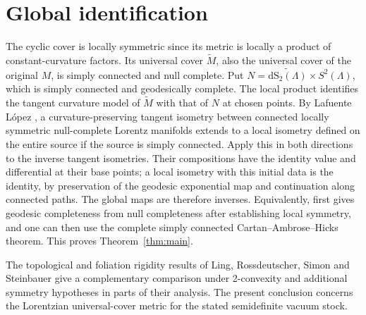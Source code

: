 \documentclass[11pt]{article}
\newcommand{\dS}{\mathrm{dS}}
\begin{document}
\section{Global identification}

The cyclic cover is locally symmetric since its metric is locally
a product of constant-curvature factors. Its universal cover
$\widetilde M$, also the universal cover of the original $M$,
is simply connected and null complete. Put
$N=\widetilde{\dS_2(\Lambda)}\times S^2(\Lambda)$, which is
simply connected and geodesically complete. The local product
identifies the tangent curvature model of $\widetilde M$ with that
of $N$ at chosen points. By Lafuente L\'opez
\cite[Theorem~1]{Laf}, a curvature-preserving tangent isometry
between connected locally symmetric null-complete Lorentz
manifolds extends to a local isometry defined on the entire
source if the source is simply connected. Apply this in both
directions to the inverse tangent isometries. Their compositions
have the identity value and differential at their base points;
a local isometry with this initial data is the identity, by
preservation of the geodesic exponential map and continuation
along connected paths. The global maps are therefore inverses.
Equivalently, \cite[Corollary~2]{Laf} first gives geodesic
completeness from null completeness after establishing local
symmetry, and one can then use the complete simply connected
Cartan--Ambrose--Hicks theorem. This proves Theorem~\ref{thm:main}.

The topological and foliation rigidity results of Ling, Rossdeutscher,
Simon and Steinbauer \cite{LRSS} give a complementary comparison
under 2-convexity and additional symmetry hypotheses in parts of their
analysis. The present conclusion concerns the Lorentzian universal-cover
metric for the stated semidefinite vacuum stock.
\end{document}
